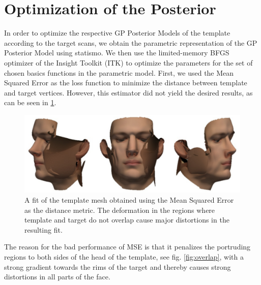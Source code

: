 \section{Optimization of the Posterior}
In order to optimize the respective GP Posterior Models of the template according to the target scans, we obtain the parametric representation of the GP Posterior Model using statismo. We then use the limited-memory BFGS optimizer of the Insight Toolkit (ITK) to optimize the parameters for the set of chosen basics functions in the parametric model. First, we used the Mean Squared Error as the loss function to minimize the distance between template and target vertices. However, this estimator did not yield the desired results, as can be seen in \ref{fig:msquaresfit}.
\begin{figure}[h!]
\centering
\includegraphics[width=.8\textwidth]{./resources/img/00029_meansquares_fit.pdf}
\caption{A fit of the template mesh obtained using the Mean Squared Error as the distance metric. The deformation in the regions where template and target do not overlap cause major distortions in the resulting fit.}
\label{fig:msquaresfit}
\end{figure}
The reason for the bad performance of MSE is that it penalizes the portruding regions to both sides of the head of the template, see fig. \ref{fig:overlap}, with a strong gradient towards the rims of the target and thereby causes strong distortions in all parts of the face. 

